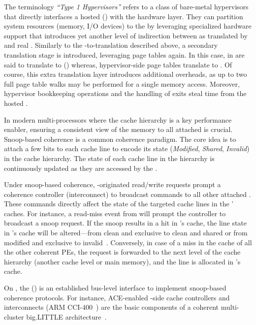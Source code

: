         The terminology \emph{``Type 1 Hypervisors''} refers to a class of bare-metal hypervisors that directly interfaces a hosted \vmlong (\vm) with the hardware layer. They can partition system resources (memory, I/O devices) to the  by leveraging specialized hardware support that introduces yet another level of indirection between  as translated by  and real . Similarly to the \va-to-\pa translation described above, a secondary translation stage is introduced, leveraging page tables again. In this case,  in  are said to translate  to  () whereas, hypervisor-side page tables translate  to .        
        Of course, this extra translation layer introduces additional overheads, as up to two full page table walks may be performed for a single \va memory access.
        Moreover, hypervisor bookkeeping operations and the handling of \vm exits steal \cpu time from the hosted .
        
        In modern multi-processors  where the cache hierarchy is a key performance enabler, ensuring a consistent view of the memory to all attached  is crucial.
        Snoop-based coherence is a common coherence paradigm.
        The core idea is to attach a few bits to each cache line to encode its state (\eg \emph{Modified}, \emph{Shared}, \emph{Invalid}) in the cache hierarchy.
        The state of each cache line in the hierarchy is continuously updated as they are accessed by the .

        Under snoop-based coherence, \pe-originated read/write requests prompt a coherence controller (\eg interconnect) to broadcast commands to all other attached .
        These commands directly affect the state of the targeted cache lines in the ' caches.
        For instance, a read-miss event from  will prompt the controller to broadcast a snoop request.
        If the snoop results in a hit in 's cache, the line state in 's cache will be altered---\eg \ci from clean and exclusive to clean and shared or \cii from modified and exclusive to invalid~\cite{MESI_protocol}.
        Conversely, in case of a miss in the cache of all the other coherent PEs, the request is forwarded to the next level of the cache hierarchy (\eg another cache level or main memory), and the line is allocated in '{s} cache.
        
        On  , the \acelong (\ace) is an established bus-level interface to implement snoop-based coherence protocols. For instance, ACE-enabled \cpu-side cache controllers and interconnects (\eg ARM CCI-400~\cite{CCI-400}) are the basic components of a coherent multi-cluster big.LITTLE architecture~\cite{ARM-big-LITTLE, chung2012heterogeneous}.


